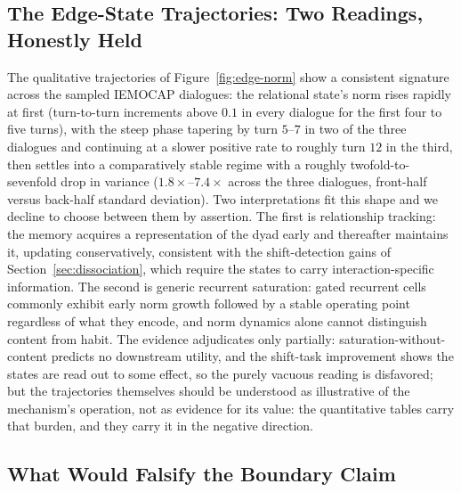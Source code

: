 \subsection{The Edge-State Trajectories: Two Readings, Honestly Held}

The qualitative trajectories of Figure~\ref{fig:edge-norm} show a consistent signature across the sampled IEMOCAP dialogues: the relational state's norm rises rapidly at first (turn-to-turn increments above $0.1$ in every dialogue for the first four to five turns), with the steep phase tapering by turn $5$--$7$ in two of the three dialogues and continuing at a slower positive rate to roughly turn $12$ in the third, then settles into a comparatively stable regime with a roughly twofold-to-sevenfold drop in variance ($1.8\times$--$7.4\times$ across the three dialogues, front-half versus back-half standard deviation). Two interpretations fit this shape and we decline to choose between them by assertion. The first is relationship tracking: the memory acquires a representation of the dyad early and thereafter maintains it, updating conservatively, consistent with the shift-detection gains of Section~\ref{sec:dissociation}, which require the states to carry interaction-specific information. The second is generic recurrent saturation: gated recurrent cells commonly exhibit early norm growth followed by a stable operating point regardless of what they encode, and norm dynamics alone cannot distinguish content from habit. The evidence adjudicates only partially: saturation-without-content predicts no downstream utility, and the shift-task improvement shows the states are read out to some effect, so the purely vacuous reading is disfavored; but the trajectories themselves should be understood as illustrative of the mechanism's operation, not as evidence for its value: the quantitative tables carry that burden, and they carry it in the negative direction.

\subsection{What Would Falsify the Boundary Claim}

